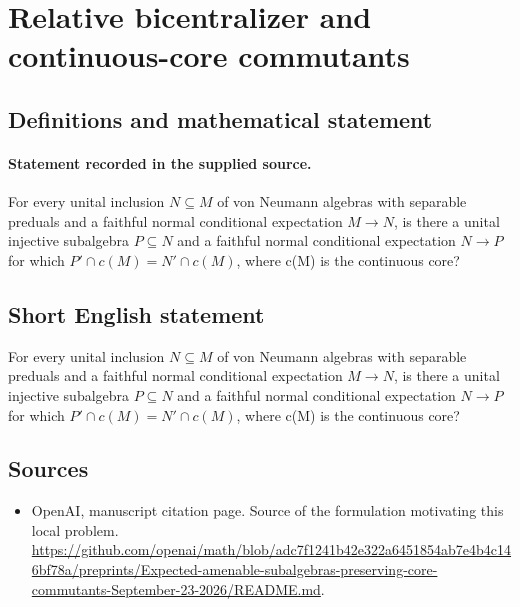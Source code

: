 \documentclass[11pt]{article}
\begin{document}
\section*{Relative bicentralizer and continuous-core commutants}\label{statement}
\subsection{Definitions and mathematical statement}
\paragraph{Statement recorded in the supplied source.}
For every unital inclusion $N\subseteq M$ of von Neumann algebras with separable preduals and a faithful normal conditional expectation $M\to N$, is there a unital injective subalgebra $P\subseteq N$ and a faithful normal conditional expectation $N\to P$ for which $P\prime \cap c(M)=N\prime \cap c(M)$, where c(M) is the continuous core?
\subsection{Short English statement}
For every unital inclusion $N\subseteq M$ of von Neumann algebras with separable preduals and a faithful normal conditional expectation $M\to N$, is there a unital injective subalgebra $P\subseteq N$ and a faithful normal conditional expectation $N\to P$ for which $P\prime \cap c(M)=N\prime \cap c(M)$, where c(M) is the continuous core?
\subsection{Sources}
\begin{itemize}
\item[S1] OpenAI, manuscript citation page. Source of the formulation motivating this local problem.
\url{https://github.com/openai/math/blob/adc7f1241b42e322a6451854ab7e4b4c146bf78a/preprints/Expected-amenable-subalgebras-preserving-core-commutants-September-23-2026/README.md}.
\end{itemize}
\end{document}

